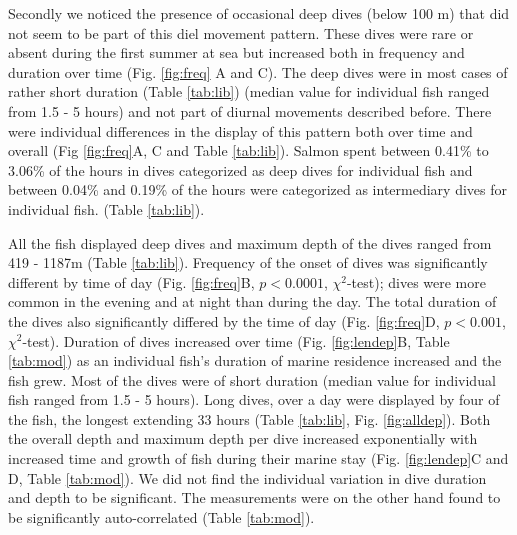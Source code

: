 Secondly we noticed the presence of occasional deep dives (below 100 m) that did not seem to be part of this diel movement pattern. These dives were rare or absent during the first summer at sea but increased both in frequency and duration over time (Fig. \ref{fig:freq} A and C). The deep dives were in most cases of rather short duration (Table \ref{tab:lib}) (median value for individual fish ranged from 1.5 - 5 hours) and not part of diurnal movements described before. There were individual differences in the display of this pattern both over time and overall (Fig \ref{fig:freq}A, C and Table \ref{tab:lib}). Salmon spent between 0.41\% to 3.06\% of the hours in dives categorized as deep dives for individual fish and between 0.04\% and 0.19\% of the hours were categorized as intermediary dives for individual fish. (Table \ref{tab:lib}).

All the fish displayed deep dives and maximum depth of the dives ranged from 419 - 1187m (Table \ref{tab:lib}). 
Frequency of the onset of dives was significantly different by time of day (Fig. \ref{fig:freq}B, $p < 0.0001$, $\chi^2$-test); dives were more common in the evening and at night than during the day. 
The total duration of the dives also significantly differed by the time of day (Fig. \ref{fig:freq}D, $p < 0.001$, $\chi^2$-test). 
Duration of dives increased over time (Fig. \ref{fig:lendep}B, Table \ref{tab:mod}) as an individual fish's duration of marine residence increased and the fish grew. 
Most of the dives were of short duration (median value for individual fish ranged from 1.5 - 5 hours). Long dives, over a day were displayed by four of the fish, the longest extending 33 hours (Table \ref{tab:lib}, Fig. \ref{fig:alldep}). 
Both the overall depth and maximum depth per dive increased exponentially with increased time and growth of fish during their marine stay (Fig. \ref{fig:lendep}C and D, Table \ref{tab:mod}).  We did not find the individual variation in dive duration and depth to be significant. The measurements were on the other hand found to be significantly auto-correlated (Table \ref{tab:mod}).

